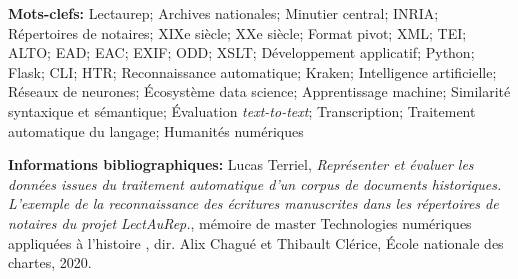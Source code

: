 \textbf{Mots-clefs:} Lectaurep; Archives nationales; Minutier central; INRIA; Répertoires de notaires; XIXe siècle; XXe siècle; Format pivot; XML; TEI; ALTO; EAD; EAC; EXIF; ODD; XSLT; Développement applicatif; Python; Flask; CLI; HTR; Reconnaissance automatique; Kraken; Intelligence artificielle; Réseaux de neurones; Écosystème data science; Apprentissage machine; Similarité syntaxique et sémantique; Évaluation \textit{text-to-text}; Transcription; Traitement automatique du langage; Humanités numériques

\bigskip
\bigskip
\bigskip

\textbf{Informations bibliographiques:} Lucas Terriel, \textit{Représenter et évaluer les données issues du traitement automatique d'un corpus de documents historiques. L'exemple de la reconnaissance des écritures manuscrites dans les répertoires de notaires du projet LectAuRep.}, mémoire de master \og Technologies numériques appliquées à l'histoire \fg{}, dir. Alix Chagué et Thibault Clérice, École nationale des chartes, 2020.

\clearpage
\thispagestyle{empty}
\cleardoublepage